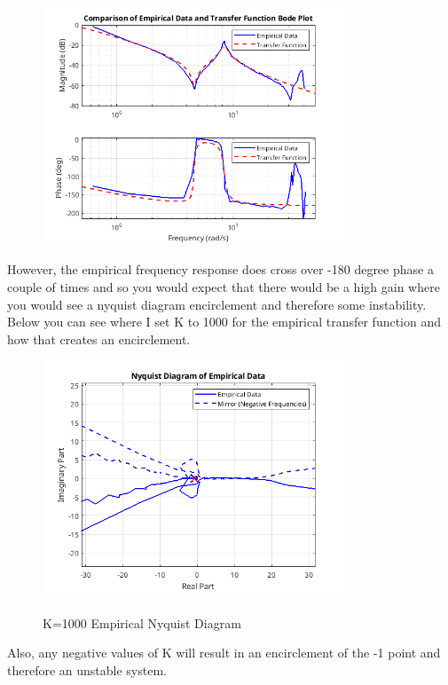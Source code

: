 \documentclass{article}
\begin{document}
\begin{figure}[H]
    \centering
    \includegraphics[width=0.8\textwidth]{analyticTFbode.png}
    \label{fig:analyticTFbodePhaseMargin}
\end{figure}

However, the empirical frequency response does cross over -180 degree phase a couple of times and so you would expect that there would be a high gain where you would see a nyquist diagram encirclement and therefore some instability.
Below you can see where I set K to 1000 for the empirical transfer function and how that creates an encirclement.

\begin{figure}[H]
    \centering
    \includegraphics[width=0.8\textwidth]{empiricalK1000zoom.png}
    \label{fig:empiricalK1000zoom}
    \caption{K=1000 Empirical Nyquist Diagram}
\end{figure}

Also, any negative values of K will result in an encirclement of the -1 point and therefore an unstable system.
\end{document}
